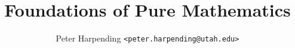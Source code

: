 \newcommand{\monospace}[1]{{\footnotesize \path{#1}}}
\newcommand{\btrurl}[1]{{\footnotesize \url{#1}}}
\newcommand{\barelink}[1]{\monospace{<}\btrurl{#1}\monospace{>}}
\newcommand{\link}[2]{#1 \barelink{#2}}
\newcommand{\mdlink}[2]{\href{#2}{#1}}
\newcommand{\xtb}{\textbf}
\newcommand{\xti}{\emph}
\newcommand{\term}{\emph}
\newcommand{\parens}[1]{\left( #1 \right)}
\newcommand{\brackets}[1]{\left[ #1 \right]}
\newcommand{\braces}[1]{\left\{ #1 \right\}}
\newcommand{\abs}[1]{\left| #1 \right|}
\newcommand{\norm}[1]{\left\| #1 \right\|}
\newcommand{\magnitude}{\norm}
\newcommand{\N}{\mathbb{N}}
\newcommand{\R}{\mathbb{R}}
\newcommand{\Q}{\mathbb{Q}}
\newcommand{\Z}{\mathbb{Z}}
\newcommand{\nil}{\varnothing}
\newcommand{\mset}[1]{\braces{\, #1 \,}}
\newcommand{\scomp}[2]{\mset{ #1 \, : \, #2 }}

\renewcommand{\implies}{\Rightarrow}
\renewcommand{\impliedby}{\Leftarrow}
\renewcommand{\iff}{\Leftrightarrow}

\newenvironment{alignmath}[1]
  {\begin{zz}\begin{tabu}{#1}}
  {\end{tabu}\end{zz}}
\newenvironment{rcl}
  {\begin{alignmath}{rcl}}
  {\end{alignmath}}
\newenvironment{rclmath}
  {\begin{rcl}}
  {\end{rcl}}
\newenvironment{zz}
  {\begin{equation*}}
  {\end{equation*}}

\newcommand{\answergraph}[1]{\texttt{[image: \#1]}}

\theoremstyle{plain}
\newtheorem{axiom}{Axiom}[section]
\newtheorem{definition}[axiom]{Definition}
\newtheorem{theorem}[axiom]{Theorem}
\newtheorem{lemma}[axiom]{Lemma}

\theoremstyle{definition}
\newtheorem{example}[axiom]{Example}
\newtheorem{remark}[axiom]{Remark}
\newtheorem{aside}[axiom]{Aside}
\newtheorem{exercise}{Exercise}[section]


\title{Foundations of Pure Mathematics}
\author{Peter Harpending {\footnotesize \texttt{<peter.harpending@utah.edu>}}}
\maketitle

